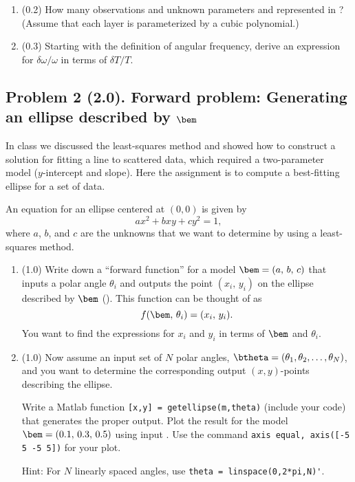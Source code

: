 \documentclass[11pt,titlepage,fleqn]{article}
\begin{document}
\begin{enumerate}
\begin{enumerate}
\item (0.2) How many observations and unknown parameters and represented in ? (Assume that each layer is parameterized by a cubic polynomial.)

\item (0.3) Starting with the definition of angular frequency, derive an expression for $\delta\omega/\omega$ in terms of $\delta T/T$.

\end{enumerate}

\end{enumerate}


\subsection*{Problem 2 (2.0). Forward problem: Generating an ellipse described by $\bem$}

In class we discussed the least-squares method and showed how to construct a solution for fitting a line to scattered data, which required a  two-parameter model ($y$-intercept and slope).  Here the assignment is to compute a best-fitting ellipse for a set of data.

An equation for an ellipse centered at $(0,0)$ is given by
%
\begin{equation}
ax^2 + bxy + cy^2 = 1,
\label{ellipse}
\end{equation}
%
where $a$, $b$, and $c$ are the unknowns that we want to determine by using a least-squares method.

\begin{enumerate}
\item (1.0) Write down a ``forward function'' for a model $\bem = (a,\,b,\,c)$ that inputs a polar angle $\theta_i$ and outputs the point $(x_i,\,y_i)$ on the ellipse described by $\bem$ (). This function can be thought of as
%
\begin{equation}
f(\bem,\,\theta_i) = (x_i,\,y_i).
\end{equation}
%
You want to find the expressions for $x_i$ and $y_i$ in terms of $\bem$ and $\theta_i$.

\item (1.0) Now assume an input set of $N$ polar angles, $\btheta = (\theta_1, \theta_2, \ldots, \theta_N)$, and you want to determine the corresponding output $(x,y)$-points describing the ellipse.

Write a Matlab function \verb+[x,y] = getellipse(m,theta)+ (include your code) that generates the proper output. Plot the result for the model $\bem = (0.1,\,0.3,\,0.5)$ using input . Use the command \verb+axis equal, axis([-5 5 -5 5])+ for your plot.

Hint: For $N$ linearly spaced angles, use \verb+theta = linspace(0,2*pi,N)'+.

\end{enumerate}
\end{document}
